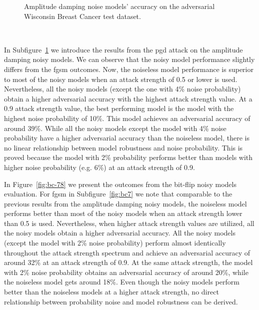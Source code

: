 \begin{figure}[!h]
\begin{subfigure}{0.45\textwidth}
      \label{fig:bc6}
  \end{subfigure}
  \caption{Amplitude damping noise models' accuracy on the adversarial Wisconsin Breast Cancer test dataset.}
  \label{fig:bc-56}
\end{figure} \

In Subfigure~\ref{fig:bc6} we introduce the results from the \ac{pgd}
attack on the amplitude damping noisy models. We can observe that the
noisy model performance slightly differs from the \ac{fgsm} outcomes.
Now, the noiseless model performance is superior to most of the noisy
models when an attack strength of 0.5 or lower is used. Nevertheless,
all the noisy models (except the one with 4\% noise probability)
obtain a higher adversarial accuracy with the highest attack strength value.
At a 0.9 attack strength value, the best performing model is the model
with the highest noise probability of 10\%. This model achieves an
adversarial accuracy of around 39\%. While all the noisy models
except the model with 4\% noise probability have a higher adversarial
accuracy than the noiseless model, there is no linear relationship
between model robustness and noise probability. This is proved because
the model with 2\% probability performs better than models with
higher noise probability (e.g. 6\%) at an attack strength of 0.9. \

In Figure~\ref{fig:bc-78} we present the outcomes from the bit-flip
noisy models evaluation. For \ac{fgsm} in Subfigure~\ref{fig:bc7}
we note that comparable to the previous results from the amplitude
damping noisy models, the noiseless model performs better than most
of the noisy models when an attack strength lower than 0.5 is used.
Nevertheless, when higher attack strength values are utilized, all
the noisy models obtain a higher adversarial accuracy. All the noisy
models (except the model with 2\% noise probability) perform almost
identically throughout the attack strength spectrum and achieve an
adversarial accuracy of around 32\% at an attack strength of 0.9.
At the same attack strength, the model with 2\% noise probability
obtains an adversarial accuracy of around 20\%, while the noiseless
model gets around 18\%. Even though the noisy models perform better
than the noiseless models at a higher attack strength, no direct
relationship between probability noise and model robustness can be
derived. \

